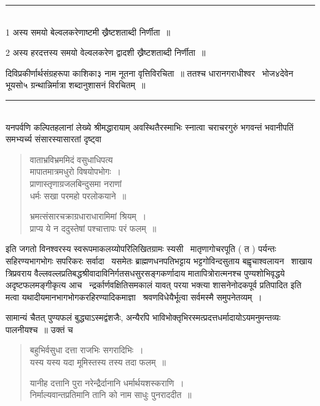 \documentclass[11pt, openany]{book}
\begin{document}
\begin{multicols}{2}
\noindent
\rule{1\linewidth}{0.5pt}\\

1 अस्य समयो बेल्वलकरेणाष्टमी ख्रैष्टशताब्दी निर्णीता~॥ 

2 अस्य हरदत्तस्य समयो वेल्वलकरेण द्वादशी ख्रैष्टशताब्दी निर्णीता~॥ 

\columnbreak

\noindent
दिविप्रकीर्णार्थसंग्रहरूपा काशिका३ नाम नूतना वृत्तिविरचिता~॥ ततश्च धारानगराधीश्वर \textendash\ भोज४देवेन भूयसो५ ग्रन्थान्निर्मात्रा शब्दानुशासनं विरचितम्~॥

\noindent
\rule{1\linewidth}{0.5pt}\\

\noindent
यनपर्वणि कल्पितहलानां लेख्ये श्रीमद्धारायाम् अवस्थितैरस्माभिः स्नात्वा चराचरगुरुं भगवन्तं भवानीपतिं समभ्यर्च्य संसारस्यासारतां दृष्ट्वा \textendash\

\begin{quote}
{\qt वाताभ्रविभ्रममिदं वसुधाधिपत्य \textendash\ \\
मापातमात्रमधुरो विषयोपभोगः~। \\
प्राणास्तृणाग्रजलबिन्दुसमा नराणां \\
धर्मः सखा परमहो परलोकयाने~॥ 

भ्रमत्संसारचक्राग्रधाराधारामिमां श्रियम्~। \\
प्राप्य ये न ददुस्तेषां पश्चात्तापः परं फलम्~॥}
\end{quote}

इति जगतो विनश्वरस्य स्वरूपमाकलय्योपरिलिखितग्रामः स्यसी \textendash\ मातृणागोचरपूति ( त ) पर्यन्तः सहिरण्यभागभोगः सपरिकरः सर्वादा \textendash\ यसमेतः ब्राह्मणधनपतिभट्टाय भट्टगोविन्दसुताय बह्वृचाश्वलायन \textendash\ शाखाय त्रिप्रवराय वैल्लवल्लप्रतिबद्धश्रीवादाविनिर्गतसधसुरसङ्गकर्णादाय मातापित्रोरात्मनश्च पुण्यशोभिवृद्धये अदृष्टफलमङ्गीकृत्य आच \textendash\ न्द्रर्कार्णवक्षितिसमकालं यावत् परया भक्त्या शासनेनोदकपूर्व प्रतिपादित इति मत्वा यथादीयमानभागभोगकरहिरण्यादिकमाज्ञा \textendash\ श्रवणविधेयैर्भूत्वा सर्वमस्मै समुपनेतव्यम्~।

सामान्यं चैतत् पुण्यफलं बुद्ध्याऽस्मद्वंशजैः, अन्यैरपि भाविभोक्तृभिरस्मत्प्रदत्तधर्मादायोऽयमनुमन्तव्यः पालनीयश्च~॥ उक्तं च \textendash\ 

\begin{quote}
{\qt बहुभिर्वसुधा दत्ता राजभिः सगरादिभिः~।\\
यस्य यस्य यदा मूमिस्तस्य तस्य तदा फलम्~॥

यानीह दत्तानि पुरा नरेन्द्रैर्दानानि धर्मार्थयशस्कराणि~।\\
निर्माल्यवान्तप्रतिमानि तानि को नाम साधुः पुनराददीत~॥

}
\end{quote}
\end{multicols}
\end{document}
